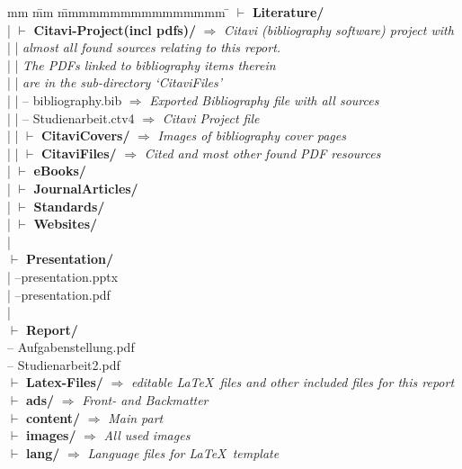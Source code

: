\begin{tabbing}
	mm \= mm \= mmmmmmmmmmmmmmmm \= \kill
	$\vdash$ \textbf{Literature/} \\ 
	| \> $\vdash$ \textbf{Citavi-Project(incl pdfs)/} \> \> $\Rightarrow$ \textit{Citavi (bibliography software) project with}\\
	| \> | \> \> \textit{almost all found sources relating to this report.} \\
	| \> | \> \> \textit{The PDFs linked to bibliography items therein} \\
	| \> | \> \> \textit{are in the sub-directory `CitaviFiles'}\\
	| \> | \>  -- bibliography.bib  \> $\Rightarrow$ \textit{Exported Bibliography file with all sources}\\
	| \> | \>  --	Studienarbeit.ctv4  \>  $\Rightarrow$ \textit{Citavi Project file}\\
	| \> | \>  $\vdash$ \textbf{CitaviCovers/} \>  $\Rightarrow$ \textit{Images of bibliography cover pages}\\
	| \> | \>  $\vdash$ \textbf{CitaviFiles/} \> $\Rightarrow$ \textit{Cited and most other found PDF resources}\\ %
	| \> $\vdash$ \textbf{eBooks/} \\
	| \> $\vdash$ \textbf{JournalArticles/} \\
	| \> $\vdash$ \textbf{Standards/}\\
	| \> $\vdash$ \textbf{Websites/} \\ %
	|\\
	$\vdash$ \textbf{Presentation/} \\
	| \>  --presentation.pptx\\
	| \>  --presentation.pdf\\
	|\\
	$\vdash$ \textbf{Report/} \\ %
	\>  -- Aufgabenstellung.pdf\\
	\>  -- Studienarbeit2.pdf\\
	\>  $\vdash$ \textbf{Latex-Files/}   $\Rightarrow$ \textit{editable \LaTeX~files and other included files for this report}\\ %
	\> \>  $\vdash$  \textbf{ads/}   	\> $\Rightarrow$ \textit{Front- and Backmatter}\\
	\> \>  $\vdash$  \textbf{content/}  \> $\Rightarrow$ \textit{Main part}\\
	\> \>  $\vdash$  \textbf{images/}   \> $\Rightarrow$ \textit{All used images}\\
	\> \>  $\vdash$  \textbf{lang/}  \> $\Rightarrow$ \textit{Language files for \LaTeX~template}\\ %
\end{tabbing}
\pagebreak
